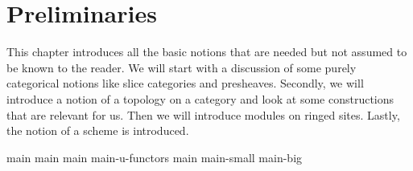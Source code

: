 \chapter{Preliminaries}
This chapter introduces all the basic notions that are needed but not assumed to be known to the reader.
We will start with a discussion of some purely categorical notions like slice categories and presheaves.
Secondly, we will introduce a notion of a topology on a category and look at some constructions that are relevant for us.
Then we will introduce modules on ringed sites.
Lastly, the notion of a scheme is introduced.

{main}
{main}
{main}
{main-u-functors}
{main}
{main-small}
{main-big}
